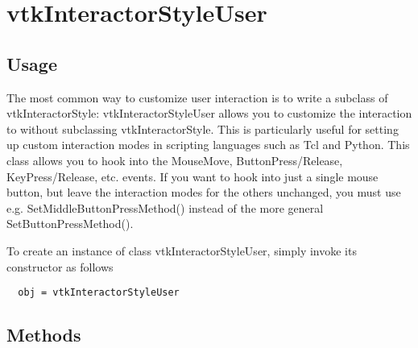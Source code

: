 \section{vtkInteractorStyleUser}

\subsection{Usage}

 The most common way to customize user interaction is to write a subclass
 of vtkInteractorStyle: vtkInteractorStyleUser allows you to customize
 the interaction to without subclassing vtkInteractorStyle.  This is
 particularly useful for setting up custom interaction modes in
 scripting languages such as Tcl and Python.  This class allows you
 to hook into the MouseMove, ButtonPress/Release, KeyPress/Release,
 etc. events.  If you want to hook into just a single mouse button,
 but leave the interaction modes for the others unchanged, you
 must use e.g. SetMiddleButtonPressMethod() instead of the more
 general SetButtonPressMethod().

To create an instance of class vtkInteractorStyleUser, simply
invoke its constructor as follows
\begin{verbatim}
  obj = vtkInteractorStyleUser
\end{verbatim}
\subsection{Methods}


